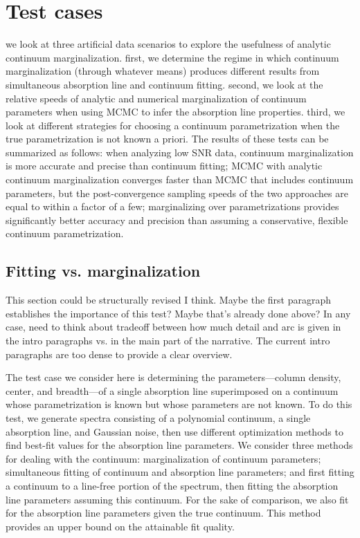 \documentclass[manuscript]{aastex62}
\begin{document}
\section{Test cases}
we look at three artificial data scenarios to explore the usefulness of analytic continuum marginalization.
first, we determine the regime in which continuum marginalization (through whatever means) produces different results from simultaneous absorption line and continuum fitting.
second, we look at the relative speeds of analytic and numerical marginalization of continuum parameters when using MCMC to infer the absorption line properties.
third, we look at different strategies for choosing a continuum parametrization when the true parametrization is not known a priori.
The results of these tests can be summarized as follows: when analyzing low SNR data, continuum marginalization is more accurate and precise than continuum fitting; MCMC with analytic continuum marginalization converges faster than MCMC that includes continuum parameters, but the post-convergence sampling speeds of the two approaches are equal to within a factor of a few; marginalizing over parametrizations provides significantly better accuracy and precision than assuming a conservative, flexible continuum parametrization.

\subsection{Fitting vs. marginalization}
This section could be structurally revised I think. Maybe the first paragraph establishes the importance of this test? Maybe that's already done above? In any case, need to think about tradeoff between how much detail and arc is given in the intro paragraphs vs. in the main part of the narrative. The current intro paragraphs are too dense to provide a clear overview.

The test case we consider here is determining the parameters---column density, center, and breadth---of a single absorption line superimposed on a continuum whose parametrization is known but whose parameters are not known.
To do this test, we generate spectra consisting of a polynomial continuum, a single absorption line, and Gaussian noise, then use different optimization methods to find best-fit values for the absorption line parameters.
We consider three methods for dealing with the continuum: marginalization of continuum parameters; simultaneous fitting of continuum and absorption line parameters; and first fitting a continuum to a line-free portion of the spectrum, then fitting the absorption line parameters assuming this continuum.
For the sake of comparison, we also fit for the absorption line parameters given the true continuum.
This method provides an upper bound on the attainable fit quality.
\end{document}
